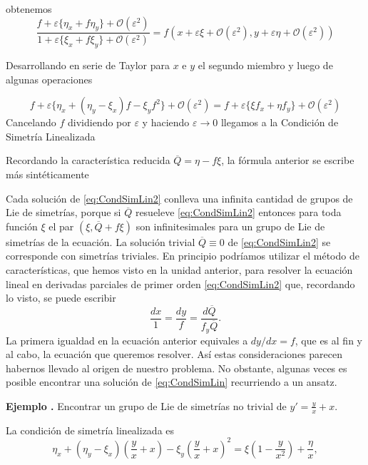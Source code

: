 \documentclass[handout,hyperref={colorlinks=true}]{beamer}
\renewcommand{\emph}[1]{\textcolor[rgb]{1,0,0}{#1}}
\renewcommand{\epsilon}{\varepsilon}
\newenvironment{ejemplo}{\noindent\textbf{Ejemplo   .} }{ }
\begin{document}
obtenemos
\[\frac{f+\epsilon\{\eta_x+f\eta_y\}+\mathcal{O}(\epsilon^2)}
{1+\epsilon\{\xi_x+f\xi_y\}+\mathcal{O}(\epsilon^2)}
=f(x+\epsilon\xi+\mathcal{O}(\epsilon^2),y+\epsilon\eta+\mathcal{O}(\epsilon^2))
\]



Desarrollando en serie de Taylor para $x$ e $y$ el segundo miembro y luego de algunas operaciones

\[f+\epsilon\{\eta_x+(\eta_y-\xi_x)f-\xi_yf^2\}+\mathcal{O}(\epsilon^2)=
 f+\epsilon\{\xi f_x+\eta f_y\}+\mathcal{O}(\epsilon^2)
\]
Cancelando $f$ dividiendo por $\epsilon$ y haciendo $\epsilon\to 0$ llegamos a la
\emph{Condición de Simetría Linealizada}


Recordando la característica reducida $\overline{Q}= \eta-f\xi$, la fórmula anterior se escribe más sintéticamente

Cada solución de \eqref{eq:CondSimLin2} conlleva una infinita cantidad de grupos de Lie de simetrías, porque si $\overline{Q}$ resueleve  \eqref{eq:CondSimLin2}  entonces para toda función $\xi$ el par $(\xi, \overline{Q}+f\xi)$ son infinitesimales para un grupo de Lie de simetrías de la ecuación. La solución trivial $\overline{Q}\equiv 0$ de  \eqref{eq:CondSimLin2}  se corresponde con simetrías triviales. En principio podríamos utilizar el método de características, que hemos visto en la unidad anterior, para resolver la ecuación lineal en derivadas parciales de primer orden \eqref{eq:CondSimLin2} que, recordando lo visto, se puede escribir
\[ \frac{dx}{1}=\frac{dy}{f}=\frac{d\overline{Q}}{f_y\overline{Q}}.\]
La primera igualdad en la ecuación anterior equivales a $dy/dx=f$, que es al fin y al cabo, la ecuación que queremos resolver. Así estas consideraciones parecen habernos llevado al origen de nuestro problema. No obstante, algunas veces es posible encontrar una solución de \eqref{eq:CondSimLin} recurriendo a un ansatz.

 \begin{ejemplo} Encontrar un grupo de Lie de simetrías no trivial de $y'=\frac{y}{x}+x$.
   \end{ejemplo}


 La condición de simetría linealizada es
 \[\eta_x+(\eta_y-\xi_x)\left(\frac{y}{x}+x\right)-\xi_y\left(\frac{y}{x}+x\right)^2
 =\xi \left(1-\frac{y}{x^2}\right)
+\frac{\eta}{x},\]
\end{document}
